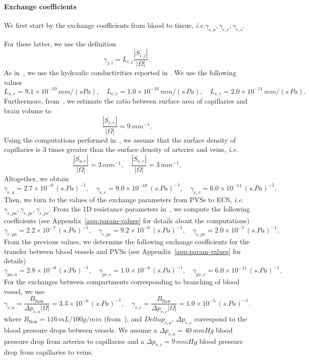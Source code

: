 \documentclass[10pt]{article}
\newcommand{\ie}{\emph{i.e.}\;}
\newcommand{\1}{^{(1)}}
\newcommand{\2}{^{(2)}}
\newcommand{\abs}[1]{\left\lvert#1\right\rvert}
\begin{document}
\paragraph{Exchange coefficients}
\begin{sloppypar}
We first start by the exchange coefficients from blood to tissue, \ie ${\gamma_{e, a}, \gamma_{e, c}, \gamma_{e, v}}$. 
\end{sloppypar}
For these latter, we use the definition
\[
    \gamma_{j, i} = L_{i,j} \frac{\abs{S_{i,j}}}{\abs{\Omega}}. 
\]
As in~\cite{shi-2014-Quantification}, we use the hydraulic conductivities reported in \cite{fraser1990measurement, kimura1993measurement, roberts2009ppar}. We use the following values  
\[
    L_{a,e} = 9.1 \times 10^{-10} \,\si{mm/(s Pa)},\quad L_{c,e} = 1.0\times 10^{-10}\, \si{mm/(s\,Pa)},\quad L_{v,e} = 2.0 \times 10^{-11} \,\si{mm/(s\,Pa)}.
\]
Furthermore, from~\cite{smith2007interstitial}, we estimate the ratio between surface area of capillaries and brain volume to 
\[
    \frac{\abs{S_{c,e}}}{\abs{\Omega}} =   9 \, \si{mm^{-1}}.
\]
Using the computations performed in~\cite{el-bouri-conferencepaper}, we assume that the surface density of capillaries is 3 times greater than the surface density of arteries and veins, \ie
\[
\frac{\abs{S_{a,e}}}{\abs{\Omega}} =   3 \, \si{mm^{-1}},\quad \frac{\abs{S_{v,e}}}{\abs{\Omega}} =   3 \, \si{mm^{-1}}.
\]
Altogether, we obtain 
\[
\gamma_{e , a} = 2.7 \times 10^{-9} \,\si{(s.Pa)^{-1} },\quad  \gamma_{e, c} =9.0 \times 10^{-10} \,\si{(s.Pa)^{-1} },\quad  \gamma_{e, v} = 6.0  \times 10^{-11} \,\si{(s.Pa)^{-1}}.
\]
Then, we turn to the values of the exchange parameters from PVSs to ECS, \ie $\gamma_{e, pa}, \gamma_{e, pc}, \gamma_{e, pv}$. From the 1D resistance parameters in~\cite{Vinje-2020-ICP}, we compute the following coefficients (see Appendix~\ref{app:param-values} for details about the computations) 
\[
\gamma_{e , pa} = 2.2 \times 10^{-7} \,\si{(s.Pa)^{-1} },\quad  \gamma_{e, pc} = 9.2 \times 10^{-9} \,\si{(s.Pa)^{-1} },\quad  \gamma_{e, pv} = 2.0 \times 10^{-7} \,\si{(s.Pa)^{-1} }.
\]
From the previous values, we determine the following exchange coefficients for the transfer between blood vessels and PVSs (see Appendix~\ref{app:param-values} for details)
\[ 
\gamma_{pa , a} = 2.8\times 10^{-9} \,\si{(s.Pa)^{-1} },\quad  \gamma_{pc, c} = 1.0 \times 10^{-9} \,\si{(s.Pa)^{-1} },\quad  \gamma_{pv, v} = 6.0 \times 10^{-11} \,\si{(s.Pa)^{-1} }.
\]
For the exchanges between compartments corresponding to branching of blood vessel, we use  
\[
    \gamma_{c , a} =  \frac{B_\text{flow}}{ \Delta p_{c , a} \abs{\Omega}} = 3.3 \times 10^{-6} \,\si{(s.Pa)^{-1}}, \quad  \gamma_{v , c} =  \frac{B_\text{flow}}{\Delta p_{v , c} \abs{\Omega}} = 1.0 \times 10^{-5}\,\si{(s.Pa)^{-1}}.
\]
where $B_\text{flow} = 116 \, \si{mL/100g/min} $ (from~\cite{Larkin}), and $Delta p_{c,a},\,\Delta p_{v , c}$ correspond to the blood pressure drops between vessels. We assume a $\Delta p_{c , a} = 40 \,\si{mmHg}$ blood pressure drop from arteries to capillaries and a $\Delta p_{v , c} = 9 \, \si{mmHg}$ blood pressure drop from capillaries to veins. 
\end{document}
